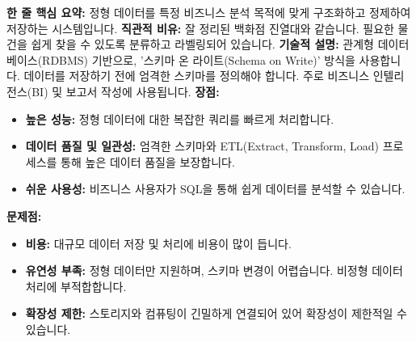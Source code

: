 \documentclass[11pt,a4paper]{article}
\theoremstyle{definition}
\begin{document}
\begin{tcolorbox}[title=\textbf{데이터 웨어하우스 (Data Warehouse)}, colback=purple!5!white, colframe=purple!75!black, sharp corners, boxrule=0.8pt]
\textbf{한 줄 핵심 요약:} 정형 데이터를 특정 비즈니스 분석 목적에 맞게 구조화하고 정제하여 저장하는 시스템입니다.
\textbf{직관적 비유:} 잘 정리된 백화점 진열대와 같습니다. 필요한 물건을 쉽게 찾을 수 있도록 분류하고 라벨링되어 있습니다.
\textbf{기술적 설명:} 관계형 데이터베이스(RDBMS) 기반으로, '스키마 온 라이트(Schema on Write)' 방식을 사용합니다. 데이터를 저장하기 전에 엄격한 스키마를 정의해야 합니다. 주로 비즈니스 인텔리전스(BI) 및 보고서 작성에 사용됩니다.
\textbf{장점:}
\begin{itemize}
    \item \textbf{높은 성능:} 정형 데이터에 대한 복잡한 쿼리를 빠르게 처리합니다.
    \item \textbf{데이터 품질 및 일관성:} 엄격한 스키마와 ETL(Extract, Transform, Load) 프로세스를 통해 높은 데이터 품질을 보장합니다.
    \item \textbf{쉬운 사용성:} 비즈니스 사용자가 SQL을 통해 쉽게 데이터를 분석할 수 있습니다.
\end{itemize}
\textbf{문제점:}
\begin{itemize}
    \item \textbf{비용:} 대규모 데이터 저장 및 처리에 비용이 많이 듭니다.
    \item \textbf{유연성 부족:} 정형 데이터만 지원하며, 스키마 변경이 어렵습니다. 비정형 데이터 처리에 부적합합니다.
    \item \textbf{확장성 제한:} 스토리지와 컴퓨팅이 긴밀하게 연결되어 있어 확장성이 제한적일 수 있습니다.
\end{itemize}
\end{tcolorbox}
\end{document}
